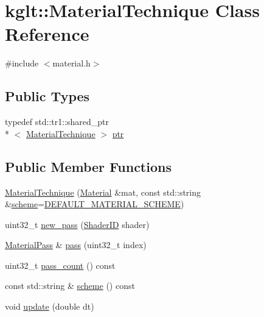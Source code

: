 \hypertarget{classkglt_1_1_material_technique}{\section{kglt\-:\-:Material\-Technique Class Reference}
\label{classkglt_1_1_material_technique}
}


{\ttfamily \#include $<$material.\-h$>$}

\subsection*{Public Types}
\begin{DoxyCompactItemize}
\item 
typedef std\-::tr1\-::shared\-\_\-ptr\\*
$<$ \hyperlink{classkglt_1_1_material_technique}{Material\-Technique} $>$ \hyperlink{classkglt_1_1_material_technique_a43d1b1c2c9108525da20361d75415258}{ptr}
\end{DoxyCompactItemize}
\subsection*{Public Member Functions}
\begin{DoxyCompactItemize}
\item 
\hyperlink{classkglt_1_1_material_technique_aab69cba75075d3967c1c694cc1106f86}{Material\-Technique} (\hyperlink{classkglt_1_1_material}{Material} \&mat, const std\-::string \&\hyperlink{classkglt_1_1_material_technique_a9e5467b84102a3b1c866a41cf535bac8}{scheme}=\hyperlink{namespacekglt_a38d05dbff502b115008d20ebdfd77a44}{D\-E\-F\-A\-U\-L\-T\-\_\-\-M\-A\-T\-E\-R\-I\-A\-L\-\_\-\-S\-C\-H\-E\-M\-E})
\item 
uint32\-\_\-t \hyperlink{classkglt_1_1_material_technique_a297546650b91e048ad5bc46201208b39}{new\-\_\-pass} (\hyperlink{namespacekglt_a2aafe4bf33d26659020117cad360422f}{Shader\-I\-D} shader)
\item 
\hyperlink{classkglt_1_1_material_pass}{Material\-Pass} \& \hyperlink{classkglt_1_1_material_technique_ae5e1f42140b8deef0b624f8e039279a4}{pass} (uint32\-\_\-t index)
\item 
uint32\-\_\-t \hyperlink{classkglt_1_1_material_technique_a242ddcc2de143161fd9a5823b75631a3}{pass\-\_\-count} () const 
\item 
const std\-::string \& \hyperlink{classkglt_1_1_material_technique_a9e5467b84102a3b1c866a41cf535bac8}{scheme} () const 
\item 
void \hyperlink{classkglt_1_1_material_technique_a64c2dd92cc5846deafca18514cf713d4}{update} (double dt)
\end{DoxyCompactItemize}


